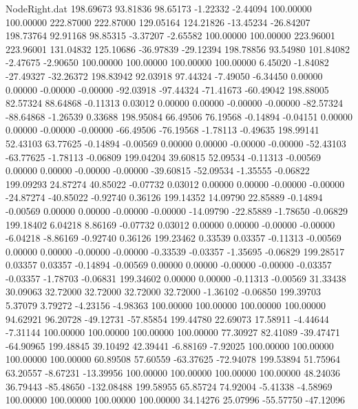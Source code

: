 \begin{filecontents}{NodeRight.dat}
 198.69673   93.81836   98.65173    -1.22332   -2.44094  100.00000  100.00000  222.87000  222.87000  129.05164  124.21826  -13.45234  -26.84207
 198.73764   92.91168   98.85315    -3.37207   -2.65582  100.00000  100.00000  223.96001  223.96001  131.04832  125.10686  -36.97839  -29.12394
 198.78856   93.54980  101.84082    -2.47675   -2.90650  100.00000  100.00000  100.00000  100.00000    6.45020   -1.84082  -27.49327  -32.26372
 198.83942   92.03918   97.44324    -7.49050   -6.34450    0.00000    0.00000   -0.00000   -0.00000  -92.03918  -97.44324  -71.41673  -60.49042
 198.88005   82.57324   88.64868    -0.11313    0.03012    0.00000    0.00000   -0.00000   -0.00000  -82.57324  -88.64868   -1.26539    0.33688
 198.95084   66.49506   76.19568    -0.14894   -0.04151    0.00000    0.00000   -0.00000   -0.00000  -66.49506  -76.19568   -1.78113   -0.49635
 198.99141   52.43103   63.77625    -0.14894   -0.00569    0.00000    0.00000   -0.00000   -0.00000  -52.43103  -63.77625   -1.78113   -0.06809
 199.04204   39.60815   52.09534    -0.11313   -0.00569    0.00000    0.00000   -0.00000   -0.00000  -39.60815  -52.09534   -1.35555   -0.06822
 199.09293   24.87274   40.85022    -0.07732    0.03012    0.00000    0.00000   -0.00000   -0.00000  -24.87274  -40.85022   -0.92740    0.36126
 199.14352   14.09790   22.85889    -0.14894   -0.00569    0.00000    0.00000   -0.00000   -0.00000  -14.09790  -22.85889   -1.78650   -0.06829
 199.18402    6.04218    8.86169    -0.07732    0.03012    0.00000    0.00000   -0.00000   -0.00000   -6.04218   -8.86169   -0.92740    0.36126
 199.23462    0.33539    0.03357    -0.11313   -0.00569    0.00000    0.00000   -0.00000   -0.00000   -0.33539   -0.03357   -1.35695   -0.06829
 199.28517    0.03357    0.03357    -0.14894   -0.00569    0.00000    0.00000   -0.00000   -0.00000   -0.03357   -0.03357   -1.78703   -0.06831
 199.34602    0.00000    0.00000    -0.11313   -0.00569   31.33438   30.09063   32.72000   32.72000   32.72000   32.72000   -1.36102   -0.06850
 199.39703    5.37079    3.79272    -4.23156   -4.98363  100.00000  100.00000  100.00000  100.00000   94.62921   96.20728  -49.12731  -57.85854
 199.44780   22.69073   17.58911    -4.44644   -7.31144  100.00000  100.00000  100.00000  100.00000   77.30927   82.41089  -39.47471  -64.90965
 199.48845   39.10492   42.39441    -6.88169   -7.92025  100.00000  100.00000  100.00000  100.00000   60.89508   57.60559  -63.37625  -72.94078
 199.53894   51.75964   63.20557    -8.67231  -13.39956  100.00000  100.00000  100.00000  100.00000   48.24036   36.79443  -85.48650 -132.08488
 199.58955   65.85724   74.92004    -5.41338   -4.58969  100.00000  100.00000  100.00000  100.00000   34.14276   25.07996  -55.57750  -47.12096

\end{filecontents}
